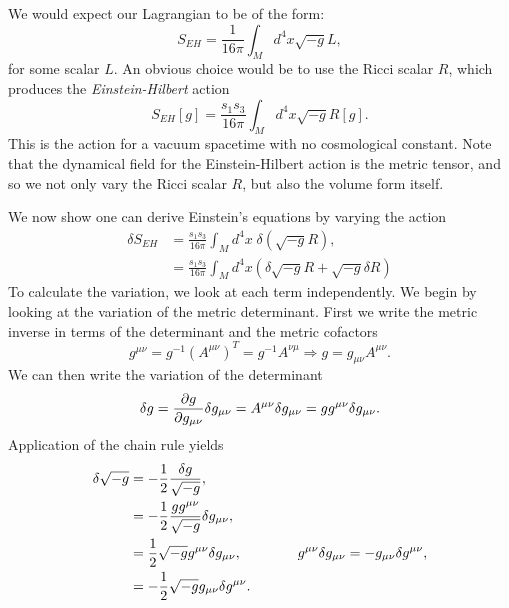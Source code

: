 We would expect our Lagrangian to be of the form:
\begin{equation*}
		S_{EH} = \frac{1}{16 \pi} \int_M d^4 x \sqrt{-g} L ,
\end{equation*} 
for some scalar $L$. An obvious choice would be to use the Ricci scalar $R$, which produces the \emph{Einstein-Hilbert} action 
\begin{equation}
	S_{EH} [g] = \frac{s_1 s_3}{16 \pi} \int_M d^4 x \sqrt{-g} R[g] .
\end{equation} 
This is the action for a vacuum spacetime with no cosmological constant. Note that the dynamical field for the Einstein-Hilbert action is the metric tensor, and so we not only vary the Ricci scalar $R$, but also the volume form itself. 

We now show one can derive Einstein's equations by varying the action
\begin{equation}
\begin{aligned}
\label{eq:ehvar}
		\delta S_{EH} &=  \frac{s_1 s_3}{16 \pi} \int_M d^4 x \; \delta(\sqrt{-g} R)  ,\\
		&=    \frac{s_1 s_3}{16 \pi} \int_M d^4 x ( \delta \sqrt{-g} R + \sqrt{-g} \delta R ) 
\end{aligned}
\end{equation}
To calculate the variation, we look at each term independently. We begin by looking at the variation of the metric determinant. First we write the metric inverse in terms of the determinant and the metric cofactors
\begin{equation*}
	g^{\mu \nu} =  g^{-1} (A^{\mu \nu})^T = g^{-1} A^{\nu \mu} \Rightarrow g = g_{\mu \nu} A^{\mu \nu}.
\end{equation*}
We can then write the variation of the determinant
\begin{equation*}
	\delta g = \frac{\partial g}{\partial g_{\mu \nu}} \delta g_{\mu \nu} = A^{\mu \nu} \delta g_{\mu \nu} = g g^{\mu \nu} \delta g_{\mu \nu}.
\end{equation*}
Application of the chain rule yields
\begin{equation*}
	\begin{aligned}
\delta \sqrt{-g} &= -\frac{1}{2} \frac{\delta g}{\sqrt{-g}}, \\
	 &= -\frac{1}{2} \frac{g g^{\mu \nu}}{\sqrt{-g}} \delta g_{\mu \nu}, \\
	&= \frac{1}{2} \sqrt{-g} g^{\mu \nu} \delta g_{\mu \nu},  \qquad \qquad g^{\mu \nu} \delta g_{\mu \nu} = - g_{\mu \nu} \delta g^{\mu \nu} ,\\
	&= -\frac{1}{2} \sqrt{-g} g_{\mu \nu} \delta g^{\mu \nu}.
	\end{aligned}
\end{equation*} 
